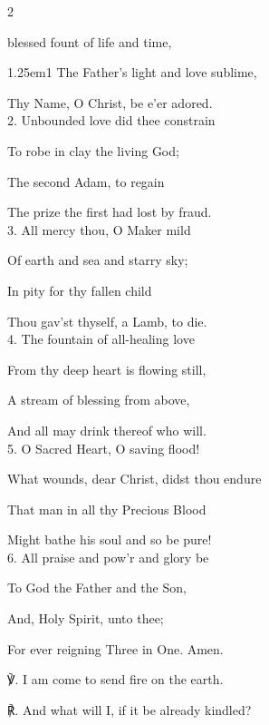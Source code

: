 \clearpage
{}

\firstEvensong
{}

\firstEvensongHymn\label{CompassionEvensongHymn}
\begin{multicols}{2}
\sloppy

 blessed fount of life and time,

\begin{hangparas}{1.25em}{1}
The Father's light and love sublime,

Thy Name, O Christ, be e'er adored.\\

2. Unbounded love did thee constrain

To robe in clay the living God;

The second Adam, to regain

The prize the first had lost by fraud.\\

3. All mercy thou, O Maker mild

Of earth and sea and starry sky;

In pity for thy fallen child

Thou gav'st thyself, a Lamb, to die.\\

4. The fountain of all-healing love

From thy deep heart is flowing still,

A stream of blessing from above,

And all may drink thereof who will.\\

5. O Sacred Heart, O saving flood!

What wounds, dear Christ, didst thou endure

That man in all thy Precious Blood

Might bathe his soul and so be pure!\\

6. All praise and pow'r and glory be

To God the Father and the Son,

And, Holy Spirit, unto thee;

For ever reigning Three in One. Amen.\\
\end{hangparas}

℣. I am come to send fire on the earth.

℟. And what will I, if it be already kindled?


\fussy
\end{multicols}

